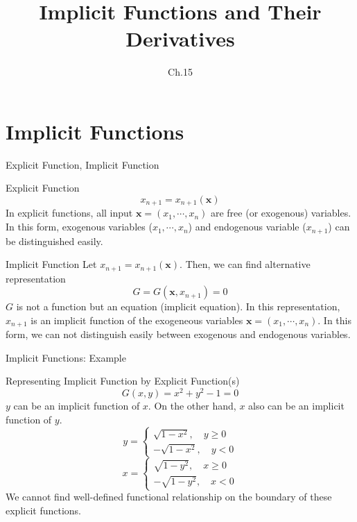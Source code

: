 \documentclass[final]{beamer}
\author[조남운]{\mail}
\title{Implicit Functions and Their Derivatives}
\subtitle{Ch.15}
\newcommand{\bd}{\mathbf}
\begin{document}
\maketitle


\section{Implicit Functions} %
\label{sec:implicit_functions}
\begin{frame}[t]{Explicit Function, Implicit Function}
	\begin{block}
		{Explicit Function}
		\[
			x_{n+1}=x_{n+1}(\bd{x})
		\]
		In explicit functions, all input $\bd{x}=(x_1,\cdots,x_n)$ are free (or exogenous) variables. In this form, exogenous variables ($x_1,\cdots,x_n$) and endogenous variable ($x_{n+1}$) can be distinguished easily.
	\end{block}
	\begin{block}
		{Implicit Function}
		Let $x_{n+1}=x_{n+1}(\bd x)$. Then, we can find alternative representation
		\[
			G=G(\bd{x},x_{n+1})=0
		\]
		$G$ is not a function but an equation (implicit equation). In this representation, $x_{n+1}$ is an implicit function of the exogeneous variables $\bd{x}=(x_1,\cdots,x_n)$. In this form, we can not distinguish easily between exogenous and endogenous variables.
	\end{block}
\end{frame}

\begin{frame}[t]{Implicit Functions: Example}
	\begin{block}
		{Representing Implicit Function by Explicit Function(s)}
		\[
			G(x,y) = x^2 + y^2 - 1 = 0
		\]
		$y$ can be an implicit function of $x$. On the other hand, $x$ also can be an implicit function of $y$.
		\[
			y=\begin{cases}
				\sqrt{1-x^2},\quad y\ge 0\\
				-\sqrt{1-x^2},\quad y< 0
			\end{cases}
		\]
		\[
			x=\begin{cases}
				\sqrt{1-y^2},\quad x\ge 0\\
				-\sqrt{1-y^2},\quad x< 0
			\end{cases}
		\]
		We cannot find well-defined functional relationship on the boundary of these explicit functions.
	\end{block}
\end{frame}
\end{document}
